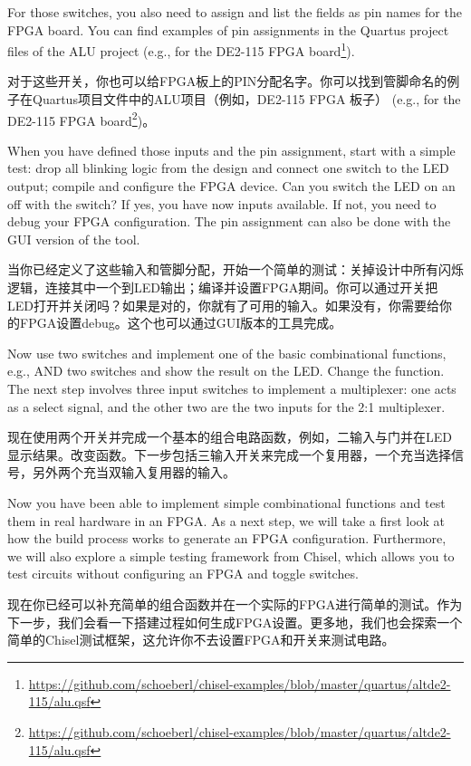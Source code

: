 \documentclass[%
    10pt,
    headinclude, footexclude,
    openright, %
    notitlepage,
    cleardoubleempty,
    headsepline,
    pointlessnumbers,
    bibtotoc, idxtotoc,
    ]{scrbook}
\newcommand{\myref}[2]{\href{#1}{#2}}
\renewcommand{\myref}[2]{{#2}{\footnote{\url{#1}}}}
\begin{document}

\noindent For those switches, you also need to assign and list the fields as pin names for the FPGA board.
You can find examples of pin assignments in the Quartus project files of the ALU project
(e.g., for the \myref{https://github.com/schoeberl/chisel-examples/blob/master/quartus/altde2-115/alu.qsf}{DE2-115
FPGA board}).

对于这些开关，你也可以给FPGA板上的PIN分配名字。你可以找到管脚命名的例子在Quartus项目文件中的ALU项目（例如，DE2-115 FPGA 板子）
(e.g., for the \myref{https://github.com/schoeberl/chisel-examples/blob/master/quartus/altde2-115/alu.qsf}{DE2-115
FPGA board})。

When you have defined those inputs and the pin assignment, start with a simple test:
drop all blinking logic from the design and connect one switch to the LED output;
compile and configure the FPGA device. Can you switch the LED on an off with the switch?
If yes, you have now inputs available. If not, you need to debug your FPGA configuration.
The pin assignment can also be done with the GUI version of the tool.

当你已经定义了这些输入和管脚分配，开始一个简单的测试：关掉设计中所有闪烁逻辑，连接其中一个到LED输出；编译并设置FPGA期间。你可以通过开关把LED打开并关闭吗？如果是对的，你就有了可用的输入。如果没有，你需要给你的FPGA设置debug。这个也可以通过GUI版本的工具完成。


Now use two switches and implement one of the basic combinational functions,
e.g., AND two switches and show the result on the LED. Change the function.
The next step involves three input switches to implement a multiplexer: one acts as
a select signal, and the other two are the two inputs for the 2:1 multiplexer.

现在使用两个开关并完成一个基本的组合电路函数，例如，二输入与门并在LED显示结果。改变函数。下一步包括三输入开关来完成一个复用器，一个充当选择信号，另外两个充当双输入复用器的输入。


Now you have been able to implement simple combinational functions and test them
in real hardware in an FPGA. As a next step, we will take a first look at how the build
process works to generate an FPGA configuration. Furthermore, we will also
explore a simple testing framework from Chisel, which allows you to test circuits
without configuring an FPGA and toggle switches.

现在你已经可以补充简单的组合函数并在一个实际的FPGA进行简单的测试。作为下一步，我们会看一下搭建过程如何生成FPGA设置。更多地，我们也会探索一个简单的Chisel测试框架，这允许你不去设置FPGA和开关来测试电路。
\end{document}
